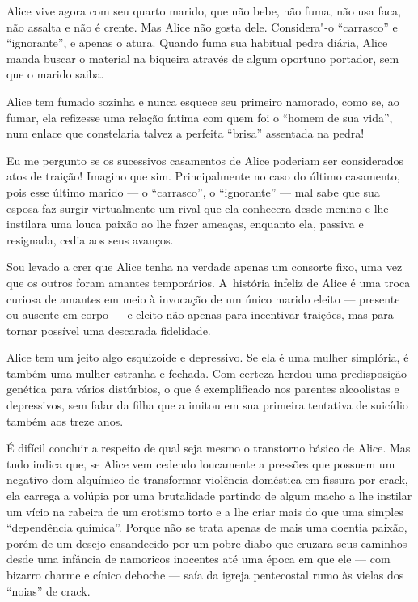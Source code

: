 Alice vive agora com seu quarto marido, que não bebe, não fuma, não usa
faca, não assalta e não é crente. Mas Alice não gosta dele. Considera"-o
``carrasco'' e ``ignorante'', e apenas o atura. Quando fuma sua habitual
pedra diária, Alice manda buscar o material na biqueira através de algum
oportuno portador, sem que o marido saiba.

Alice tem fumado sozinha e nunca esquece seu primeiro namorado, como se,
ao fumar, ela refizesse uma relação íntima com quem foi o ``homem de sua
vida'', num enlace que constelaria talvez a perfeita ``brisa'' assentada
na pedra!

Eu me pergunto se os sucessivos casamentos de Alice poderiam ser
considerados atos de traição! Imagino que sim. Principalmente no caso do
último casamento, pois esse último marido --- o ``carrasco'', o
``ignorante'' --- mal sabe que sua esposa faz surgir virtualmente um
rival que ela conhecera desde menino e lhe instilara uma louca paixão ao
lhe fazer ameaças, enquanto ela, passiva e resignada, cedia aos seus
avanços.

Sou levado a crer que Alice tenha na verdade apenas um consorte fixo,
uma vez que os outros foram amantes temporários. A~história infeliz de
Alice é uma troca curiosa de amantes em meio à invocação de um único
marido eleito --- presente ou ausente em corpo --- e eleito não apenas
para incentivar traições, mas para tornar possível uma descarada
fidelidade.

Alice tem um jeito algo esquizoide e depressivo. Se ela é uma mulher
simplória, é também uma mulher estranha e fechada. Com certeza herdou
uma predisposição genética para vários distúrbios, o que é exemplificado
nos parentes alcoolistas e depressivos, sem falar da filha que a imitou
em sua primeira tentativa de suicídio também aos treze anos.

É difícil concluir a respeito de qual seja mesmo o transtorno básico de
Alice. Mas tudo indica que, se Alice vem cedendo loucamente a pressões
que possuem um negativo dom alquímico de transformar violência doméstica
em fissura por crack, ela carrega a volúpia por uma brutalidade partindo
de algum macho a lhe instilar um vício na rabeira de um erotismo torto e
a lhe criar mais do que uma simples ``dependência química''. Porque não
se trata apenas de mais uma doentia paixão, porém de um desejo
ensandecido por um pobre diabo que cruzara seus caminhos desde uma
infância de namoricos inocentes até uma época em que ele --- com bizarro
charme e cínico deboche --- saía da igreja pentecostal rumo às vielas
dos ``noias'' de crack.

